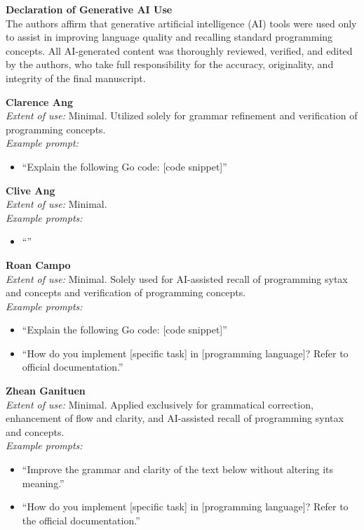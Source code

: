 \documentclass{article}
\begin{document}
\vfill
{\footnotesize
    \noindent\textbf{Declaration of Generative AI Use} \\
    The authors affirm that generative artificial intelligence (AI) tools were used only to assist in improving language quality and recalling standard programming concepts. All AI-generated content was thoroughly reviewed, verified, and edited by the authors, who take full responsibility for the accuracy, originality, and integrity of the final manuscript.

    \medskip
    \noindent\textbf{Clarence Ang} \\
    \emph{Extent of use:} Minimal. Utilized solely for grammar refinement and verification of programming concepts. \\
    \emph{Example prompt:}
    \begin{itemize}
        \item ``Explain the following Go code: [code snippet]''
    \end{itemize}

    \noindent\textbf{Clive Ang} \\
    \emph{Extent of use:} Minimal. \\
    \emph{Example prompts:}
    \begin{itemize}
        \item ``''
    \end{itemize}

    \noindent\textbf{Roan Campo} \\
    \emph{Extent of use:} Minimal. Solely used for AI-assisted recall of programming sytax and concepts and verification of programming concepts. \\
    \emph{Example prompts:}
    \begin{itemize}
        \item ``Explain the following Go code: [code snippet]''
        \item ``How do you implement [specific task] in [programming language]? Refer to official documentation.''
    \end{itemize}

    \noindent\textbf{Zhean Ganituen} \\
    \emph{Extent of use:} Minimal. Applied exclusively for grammatical correction, enhancement of flow and clarity, and AI-assisted recall of programming syntax and concepts. \\
    \emph{Example prompts:}
    \begin{itemize}
        \item ``Improve the grammar and clarity of the text below without altering its meaning.''
        \item ``How do you implement [specific task] in [programming language]? Refer to the official documentation.''
    \end{itemize}
    \par}
\end{document}
